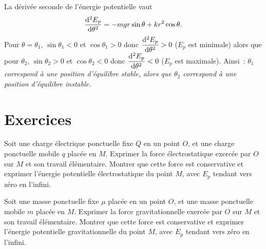 La dérivée seconde de l'énergie potentielle vaut
\begin{equation}%
  \deriveds{E_p}{\theta} = -mgr\sin\theta +kr^2\cos\theta.
\end{equation}%
Pour \(\theta=\theta_1\), \(\sin\theta_1<0\) et \(\cos\theta_1>0\) donc 
\(\dfrac{\mathrm{d}^2 E_p}{\mathrm{d} {\theta}^2}>0\) (\(E_p\) est minimale) alors que pour 
\(\theta_2\), \(\sin\theta_2>0\) et \(\cos\theta_2<0\) donc 
\(\dfrac{\mathrm{d}^2 E_p}{\mathrm{d} {\theta}^2}<0\) (\(E_p\) est maximale). Ainsi~: \emph{\(\theta_1\) 
correspond à une position d'équilibre stable, alors que \(\theta_2\) correspond 
à une position d'équilibre instable.}
\section{Exercices}%
\label{chap4-sec:exercices}%
\begin{exercice}%
  Soit une charge électrique ponctuelle fixe \(Q\) en un point \(O\), et une 
  charge ponctuelle mobile \(q\) placée en \(M\). Exprimer la force 
  électrostatique exercée par \(O\) sur \(M\) et son travail élémentaire. 
  Montrer que cette force est conservative et exprimer l'énergie potentielle 
  électrostatique du point \(M\), avec \(E_p\) tendant vers zéro en l'infini.
\end{exercice}%
%
\begin{exercice}%
  Soit une masse ponctuelle fixe \(\mu\) placée en un point \(O\), et une masse 
  ponctuelle mobile \(m\) placée en \(M\). Exprimer la force gravitationnelle 
  exercée par \(O\) sur \(M\) et son travail élémentaire. Montrer que cette 
  force est conservative et exprimer l'énergie potentielle gravitationnelle du 
  point \(M\), avec \(E_p\) tendant vers zéro en l'infini.
\end{exercice}%
%
